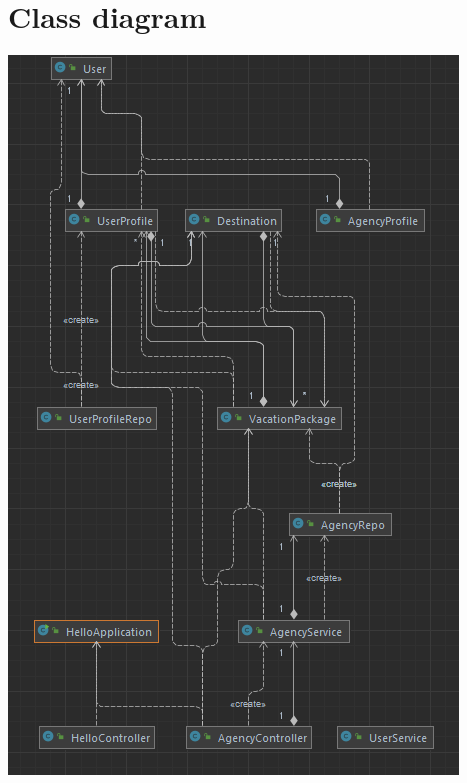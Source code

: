 \documentclass[a4paper,12pt]{report}
\begin{document}
	\chapter*{Class diagram}
		\includegraphics[width=\textwidth, height=\textheight]{A1_class_diagram}
\end{document}
